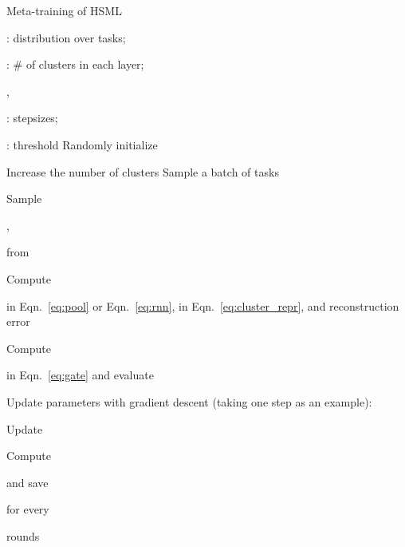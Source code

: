 \documentclass{article}
\begin{document}
\begin{algorithm}[tb]
   \caption{Meta-training of HSML}
   \label{alg:hsml}
\begin{algorithmic}[1]
\REQUIRE \begin{small}\end{small}: distribution over tasks; \begin{small}\end{small}: \# of clusters in each layer; \begin{small}\end{small}, \begin{small}\end{small}: stepsizes; \begin{small}\end{small}: threshold
    \STATE Randomly initialize \begin{small} \end{small}
    \IF{\begin{small}\end{small}}
    \STATE Increase the number of clusters \ENDIF
    \STATE Sample a batch of tasks \begin{small}\end{small}
    \FORALL{\begin{small}\end{small}}
    \STATE Sample \begin{small}\end{small}, \begin{small}\end{small} from \begin{small}\end{small}
    \STATE Compute \begin{small}\end{small} in Eqn.~\eqref{eq:pool} or Eqn.~\eqref{eq:rnn},  in Eqn.~\eqref{eq:cluster_repr}, and reconstruction error \begin{small}\end{small}
    \STATE Compute \begin{small}\end{small} in Eqn.~\eqref{eq:gate} and evaluate \begin{small}\end{small}
    \STATE Update parameters with gradient descent (taking one step as an example): \begin{small}\end{small}
    \ENDFOR
    \STATE Update \begin{small}\end{small} 
    \STATE Compute \begin{small}\end{small} and save \begin{small}\end{small} for every \begin{small}\end{small} rounds
    \ENDWHILE
\end{algorithmic}
\end{algorithm}
\end{document}
